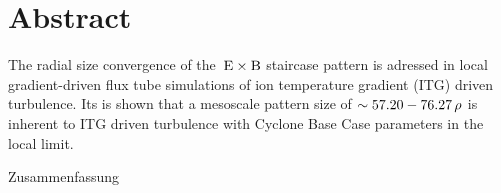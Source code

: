 
\chapter*{Abstract}
\label{chap:abstract}

The radial size convergence of the $\mathrm{\:E}\times\mathrm{B}$ staircase pattern is adressed in local gradient-driven flux tube simulations of ion temperature gradient (ITG) driven turbulence.
Its is shown that a mesoscale pattern size of $\sim 57.20-76.27\,\rho$ is inherent to ITG driven turbulence with Cyclone Base Case parameters in the local limit.
\bigskip 
\bigskip 
\bigskip 

Zusammenfassung